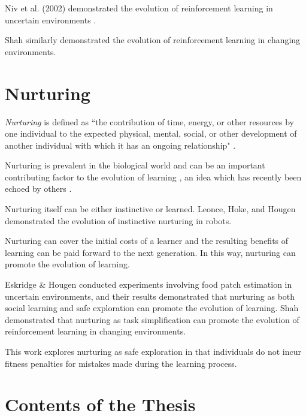 \documentclass[master]{outhesis}
\begin{document}

Niv et al. (2002) demonstrated the evolution of reinforcement learning in uncertain environments \cite{Niv:2002aa}.

Shah \cite{Shah:2015hs} similarly demonstrated the evolution of reinforcement learning in changing environments.

\section{Nurturing}

\emph{Nurturing} is defined as ``the contribution of time, energy, or other resources by one individual to the expected physical, mental, social, or other development of another individual with which it has an ongoing relationship" \cite{nurturing-definition}.

Nurturing is prevalent in the biological world and can be an important contributing factor to the evolution of learning \cite{nurturing-definition} \cite{eskridge-learning-uncertain-environments},
an idea which has recently been echoed by others \cite{Soltoggio:2017bl}.

Nurturing itself can be either instinctive or learned.
Leonce, Hoke, and Hougen \cite{evolution-of-nurturing} demonstrated the evolution of instinctive nurturing in robots.


Nurturing can cover the initial costs of a learner and the resulting benefits of learning can be paid forward to the next generation.
In this way, nurturing can promote the evolution of learning.

Eskridge \& Hougen \cite{eskridge-learning-uncertain-environments} conducted experiments involving food patch estimation in uncertain environments,
and their results demonstrated that nurturing as both social learning and safe exploration can promote the evolution of learning.
Shah \cite{Shah:2015hs} demonstrated that nurturing as task simplification can promote the evolution of reinforcement learning in changing environments.

This work explores nurturing as safe exploration in that individuals do not incur fitness penalties for mistakes made during the learning process.

\section{Contents of the Thesis}
\end{document}
